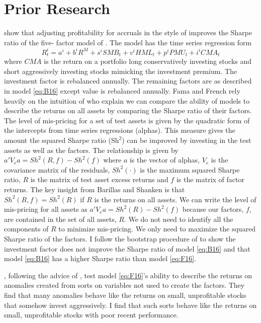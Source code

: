 
\section*{Prior Research}

\textcite{fama2016choosing} show that adjusting profitability for accruals in
the style of \textcite{ball2016accruals} improves the Sharpe ratio of the five-
factor model of \textcite{fama2015five}.
The model has the time series regression form
\begin{equation} \label{eq:F16}
R_t^i = a^i+b^iR^M+s^iSMB_t+v^iHML_t+p^iPMU_t+i^iCMA_t
\end{equation}
where $CMA$ is the return on a portfolio long conservatively investing stocks
and short aggressively investing stocks mimicking the investment premium.
The investment factor is rebalanced annually.
The remaining factors are as described in model \ref{eq:B16} except value is
rebalanced annually.
Fama and French rely heavily on the intuition of \textcite{barillas2016alpha}
who explain we can compare the ability of models to describe the returns on all
assets by comparing the Sharpe ratio of their factors.
The level of mis-pricing for a set of test assets is given by the quadratic
form of the intercepts from time series regressions (alphas).
This measure gives the amount the squared Sharpe ratio ($\text{Sh}^2$) can be
improved by investing in the test assets as well as the factors.
The relationship is given by $a'V_ea=Sh^2\left(R,f\right)-Sh^2\left(f\right)$
where $a$ is the vector of alphas, $V_e$ is the covariance matrix of the
residuals, $Sh^2\left(\cdot\right)$ is the maximum squared Sharpe ratio, $R$ is
the matrix of test asset excess returns and $f$ is the matrix of factor
returns.
The key insight from Barillas and Shanken is that
$Sh^2\left(R,f\right)=Sh^2\left(R\right)$ if $R$ is the returns on all assets.
We can write the level of mis-pricing for all assets as
$a'V_ea=Sh^2\left(R\right)-Sh^2\left(f\right)$ because our factors, $f$, are
contained in the set of all assets, $R$.
We do not need to identify all the components of $R$ to minimize mis-pricing.
We only need to maximize the squared Sharpe ratio of the factors.
I follow the bootstrap procedure of \textcite{fama2016choosing} to show the
investment factor does not improve the Sharpe ratio of model \ref{eq:B16} and
that model \ref{eq:B16} has a higher Sharpe ratio than model \ref{eq:F16}.

\textcite{fama2016dissecting}, following the advice of
\textcite{lewellen2010skeptical}, test model \ref{eq:F16}'s ability to describe
the returns on anomalies created from sorts on variables not used to create the
factors. They find that many anomalies
behave like the returns on small, unprofitable stocks that
somehow invest aggressively. I find that such sorts behave like the returns on
small, unprofitable stocks with poor recent performance.

